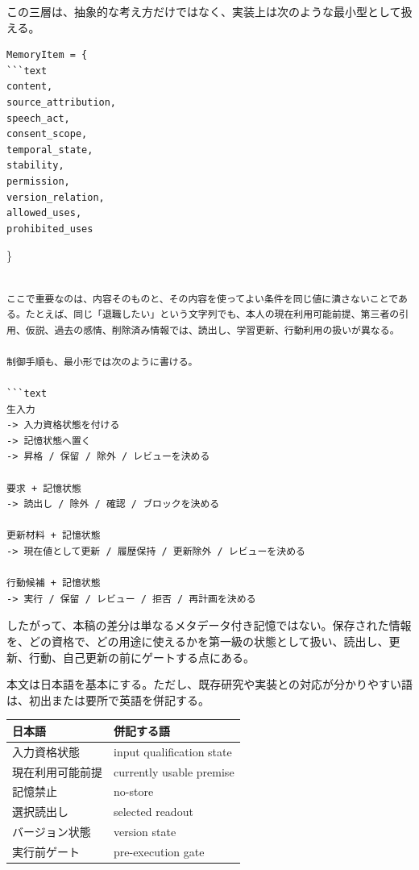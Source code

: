 \documentclass[12pt,a4paper]{article}
\begin{document}
この三層は、抽象的な考え方だけではなく、実装上は次のような最小型として扱える。

\begin{verbatim}
MemoryItem = {
```text
content,
source_attribution,
speech_act,
consent_scope,
temporal_state,
stability,
permission,
version_relation,
allowed_uses,
prohibited_uses
\end{verbatim}

\}

\begin{verbatim}

ここで重要なのは、内容そのものと、その内容を使ってよい条件を同じ値に潰さないことである。たとえば、同じ「退職したい」という文字列でも、本人の現在利用可能前提、第三者の引用、仮説、過去の感情、削除済み情報では、読出し、学習更新、行動利用の扱いが異なる。

制御手順も、最小形では次のように書ける。

```text
生入力
-> 入力資格状態を付ける
-> 記憶状態へ置く
-> 昇格 / 保留 / 除外 / レビューを決める

要求 + 記憶状態
-> 読出し / 除外 / 確認 / ブロックを決める

更新材料 + 記憶状態
-> 現在値として更新 / 履歴保持 / 更新除外 / レビューを決める

行動候補 + 記憶状態
-> 実行 / 保留 / レビュー / 拒否 / 再計画を決める
\end{verbatim}

したがって、本稿の差分は単なるメタデータ付き記憶ではない。保存された情報を、どの資格で、どの用途に使えるかを第一級の状態として扱い、読出し、更新、行動、自己更新の前にゲートする点にある。

本文は日本語を基本にする。ただし、既存研究や実装との対応が分かりやすい語は、初出または要所で英語を併記する。

{\def\LTcaptype{table} %
\begin{longtable}[]{@{}ll@{}}
\toprule\noalign{}
日本語 & 併記する語 \\
\midrule\noalign{}
\endhead
\bottomrule\noalign{}
\endlastfoot
入力資格状態 & input qualification state \\
現在利用可能前提 & currently usable premise \\
記憶禁止 & no-store \\
選択読出し & selected readout \\
バージョン状態 & version state \\
実行前ゲート & pre-execution gate \\
\end{longtable}
}
\end{document}
